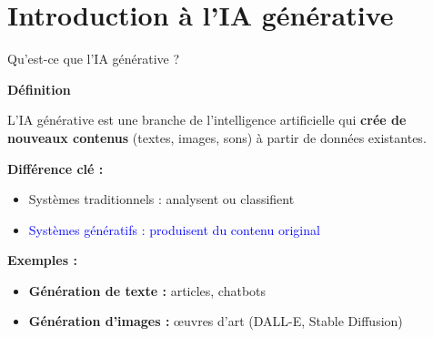 \section{Introduction à l'IA générative}

\begin{frame}{Qu'est-ce que l'IA générative ?}

\textbf{Définition}

\vspace{0.3cm}

L'IA générative est une branche de l'intelligence artificielle qui \textbf{crée de nouveaux contenus} (textes, images, sons) à partir de données existantes.

\vspace{0.3cm}

\textbf{Différence clé :}
\begin{itemize}
    \item Systèmes traditionnels : analysent ou classifient
    \item \textcolor{blue}{Systèmes génératifs : produisent du contenu original}
\end{itemize}

\vspace{0.3cm}

\textbf{Exemples :}
\begin{itemize}
    \item \textbf{Génération de texte :} articles, chatbots
    \item \textbf{Génération d'images :} œuvres d'art (DALL-E, Stable Diffusion)
\end{itemize}

\end{frame}

